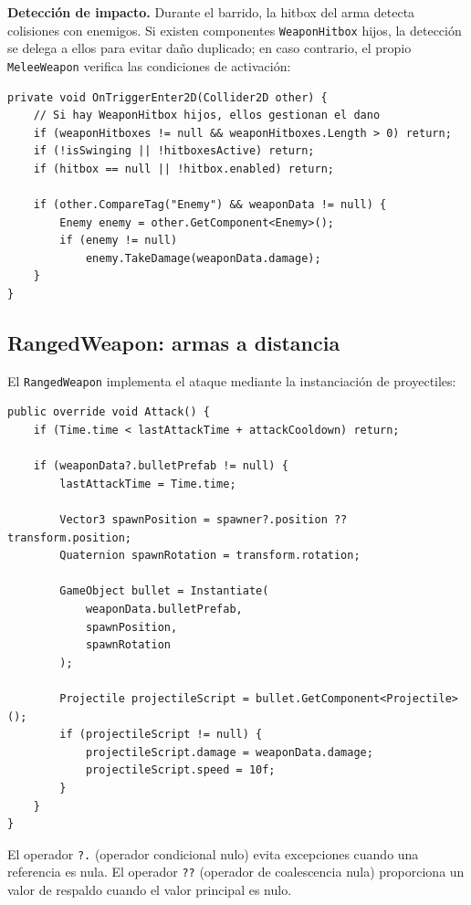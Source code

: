 \textbf{Detección de impacto.} Durante el barrido, la hitbox del arma detecta colisiones con enemigos. Si existen componentes \texttt{WeaponHitbox} hijos, la detección se delega a ellos para evitar daño duplicado; en caso contrario, el propio \texttt{MeleeWeapon} verifica las condiciones de activación:

\begin{lstlisting}
private void OnTriggerEnter2D(Collider2D other) {
    // Si hay WeaponHitbox hijos, ellos gestionan el dano
    if (weaponHitboxes != null && weaponHitboxes.Length > 0) return;
    if (!isSwinging || !hitboxesActive) return;
    if (hitbox == null || !hitbox.enabled) return;
    
    if (other.CompareTag("Enemy") && weaponData != null) {
        Enemy enemy = other.GetComponent<Enemy>();
        if (enemy != null)
            enemy.TakeDamage(weaponData.damage);
    }
}
\end{lstlisting}


\subsection{RangedWeapon: armas a distancia}


El \texttt{RangedWeapon} implementa el ataque mediante la instanciación de proyectiles:

\begin{lstlisting}
public override void Attack() {
    if (Time.time < lastAttackTime + attackCooldown) return;
    
    if (weaponData?.bulletPrefab != null) {
        lastAttackTime = Time.time;
        
        Vector3 spawnPosition = spawner?.position ?? transform.position;
        Quaternion spawnRotation = transform.rotation;
        
        GameObject bullet = Instantiate(
            weaponData.bulletPrefab, 
            spawnPosition, 
            spawnRotation
        );
        
        Projectile projectileScript = bullet.GetComponent<Projectile>();
        if (projectileScript != null) {
            projectileScript.damage = weaponData.damage;
            projectileScript.speed = 10f;
        }
    }
}
\end{lstlisting}


El operador \texttt{?.} (operador condicional nulo) evita excepciones cuando una referencia es nula. El operador \texttt{??} (operador de coalescencia nula) proporciona un valor de respaldo cuando el valor principal es nulo.

